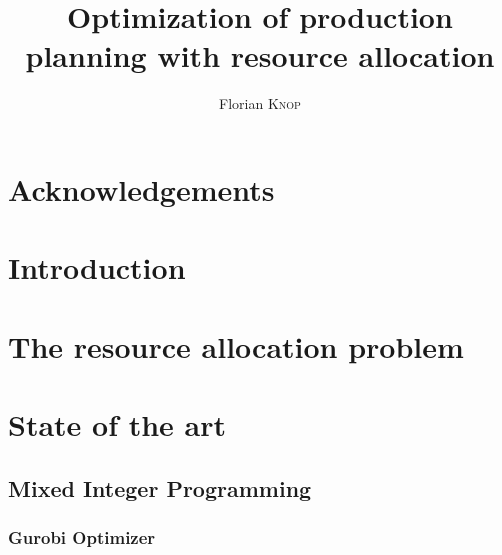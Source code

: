 \documentclass{template/EPL-master-thesis-covers-EN}
\title{Optimization of production planning with resource allocation}
\author{Florian \textsc{Knop}}
\begin{document}
  \def\chapterautorefname{Chapter}
  \def\sectionautorefname{Section}
  \newcommand{\vone}{Village n\textsuperscript{o}1}

  
  \maketitle

  \thispagestyle{plain}


  \begin{abstract}
    \normalsize
    \lipsum[1]
  \end{abstract}


  \chapter*{Acknowledgements}

  \lipsum[1]

  \tableofcontents




  \chapter{Introduction}
  \label{chapter:introduction}
  

  \chapter{The resource allocation problem}
  \label{chapter:problem}
  


  \chapter{State of the art}
  \label{chapter:sota}

  

  \section{Mixed Integer Programming}
  

  \subsection{Gurobi Optimizer}
  \label{subsection:gurobi}
  
\end{document}
